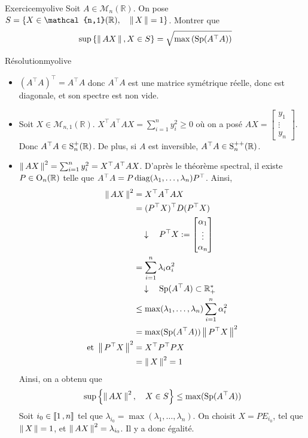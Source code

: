     \begin{omed}{Exercice}{myolive}
        Soit $A \in \mathcal{M}_n(\mathbb{R})$. On pose $S = \left\{X \in \mathcal{n,1}(\mathbb{R}), \quad \norm{X} = 1\right\}$. Montrer que 
        \[ \sup\left\{\left\lVert\,AX\,\right\rVert, X \in S\right\} = \sqrt{\max\left(\operatorname{Sp}(A^{\top} A)\right)} \]
    \end{omed}

    \begin{demo}{Résolution}{myolive}
        \begin{itemize}
            \item $(A^{\top} A)^{\top} = A^{\top} A$ donc $A^{\top} A$ est une matrice symétrique réelle, donc est diagonale, et son spectre est non vide. 
            \item Soit $X \in \mathcal{M}_{n,1}(\mathbb{R})$. $X^{\top} A^{\top} AX = \sum_{i=1}^{n} y_i^2 \geq 0$ où on a posé $AX = \begin{bmatrix}
                y_1 \\
                \vdots \\
                y_n
            \end{bmatrix}$. Donc $A^{\top} A \in \operatorname{S}_n^+(\mathbb{R})$. De plus, si $A$ est inversible, $A^{\top} A \in \operatorname{S}_n^{++}(\mathbb{R})$.
            \item $\left\lVert\,AX\,\right\rVert^2 = \sum_{i=1}^{n} y_i^2 = X^{\top} A^{\top} A X$. D’après le théorème spectral, il existe $P \in \operatorname{O}_n(\mathbb{R})$ telle que $A^{\top} A = P \operatorname{diag}(\lambda_1,\ldots, \lambda_n) P^{\top}$. Ainsi,
            \begin{align*}
                \left\lVert\,AX\,\right\rVert^2 
                &= X^{\top} A^{\top} AX \\
                &= (P^{\top} X)^{\top} D (P^{\top} X) \\
                &\quad \downarrow \quad P^{\top} X := \begin{bmatrix}
                    \alpha_1 \\
                    \vdots \\
                    \alpha_n 
                \end{bmatrix} \\
                &= \sum_{i=1}^{n} \lambda_i \alpha_i^2 \\
                &\quad \downarrow \quad \operatorname{Sp}(A^{\top} A) \subset \mathbb{R}_+^* \\
                &\leq \max(\lambda_1,\ldots,\lambda_n) \sum_{i=1}^{n} \alpha_i^2 \\
                &= \max(\operatorname{Sp}(A^{\top}A)) \left\lVert\,P^{\top}X\,\right\rVert^2 \\
                \text{et } \left\lVert\,P^{\top} X\,\right\rVert^2 &= X^{\top} P^{\top} P X \\
                &= \left\lVert\,X\,\right\rVert^2 = 1
            \end{align*}
            Ainsi, on a obtenu que \[ \sup\left\{\left\lVert\,AX\,\right\rVert^2, \quad X \in S\right\} \leq \max(\operatorname{Sp}(A^{\top}A)) \] 
            Soit $i_0 \in \left\llbracket 1 \, , n \right\rrbracket$ tel que $\lambda_{i_0} = \max(\lambda_1,\ldots,\lambda_n)$. On choisit $X = P E_{i_0}$, tel que $\left\lVert\,X\,\right\rVert = 1$, et $\left\lVert\,AX\,\right\rVert^2 = \lambda_{i_0}$. Il y a donc égalité.
        \end{itemize}
    \end{demo}